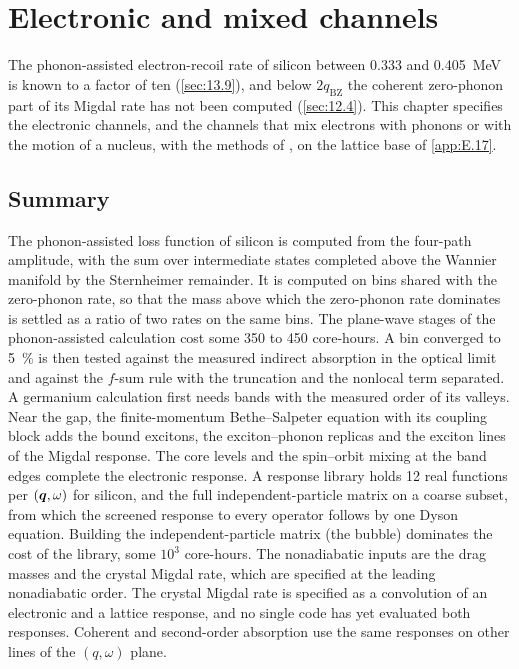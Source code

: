 \chapter{Electronic and mixed channels}\label{chap:31}

The phonon-assisted electron-recoil rate of silicon between 0.333 and \SI{0.405}{MeV} is known to a factor of ten (\cref{sec:13.9}), and below $2q_{\mathrm{BZ}}$ the coherent zero-phonon part of its Migdal rate has not been computed (\cref{sec:12.4}). This chapter specifies the electronic channels, and the channels that mix electrons with phonons or with the motion of a nucleus, with the methods of , on the lattice base of \cref{app:E.17}.







\section*{Summary}

The phonon-assisted loss function of silicon is computed from the four-path amplitude, with the sum over intermediate states completed above the Wannier manifold by the Sternheimer remainder. It is computed on bins shared with the zero-phonon rate, so that the mass above which the zero-phonon rate dominates is settled as a ratio of two rates on the same bins. The plane-wave stages of the phonon-assisted calculation cost some 350 to 450 core-hours. A bin converged to \SI{5}{\percent} is then tested against the measured indirect absorption in the optical limit and against the $f$-sum rule with the truncation and the nonlocal term separated. A germanium calculation first needs bands with the measured order of its valleys. Near the gap, the finite-momentum Bethe--Salpeter equation with its coupling block adds the bound excitons, the exciton--phonon replicas and the exciton lines of the Migdal response. The core levels and the spin--orbit mixing at the band edges complete the electronic response. A response library holds 12 real functions per $(\bm{q},\omega)$ for silicon, and the full independent-particle matrix on a coarse subset, from which the screened response to every operator follows by one Dyson equation. Building the independent-particle matrix (the bubble) dominates the cost of the library, some $10^3$ core-hours. The nonadiabatic inputs are the drag masses and the crystal Migdal rate, which are specified at the leading nonadiabatic order. The crystal Migdal rate is specified as a convolution of an electronic and a lattice response, and no single code has yet evaluated both responses. Coherent and second-order absorption use the same responses on other lines of the $(q,\omega)$ plane.

\printbibliography[heading=subbibliography]
